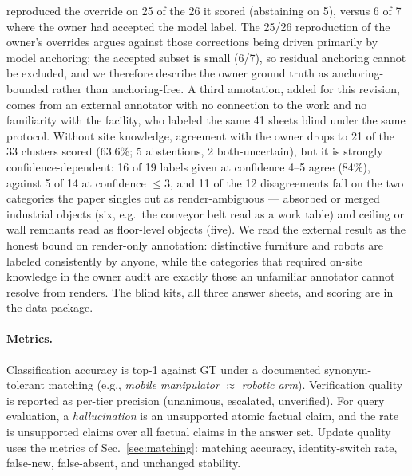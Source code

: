 reproduced the override on 25 of the 26 it scored (abstaining on 5),
versus 6 of 7 where the owner had accepted the model label. The 25/26 reproduction of the owner's overrides argues against those
corrections being driven primarily by model anchoring; the accepted
subset is small (6/7), so residual anchoring cannot be excluded, and we
therefore describe the owner ground truth as anchoring-bounded rather
than anchoring-free. A third annotation, added for this revision, comes
from an external annotator with no connection to the work and no
familiarity with the facility, who labeled the same 41 sheets blind
under the same protocol. Without site knowledge, agreement with the
owner drops to 21 of the 33 clusters scored (63.6\%; 5 abstentions, 2
both-uncertain), but it is strongly confidence-dependent: 16 of 19
labels given at confidence 4--5 agree (84\%), against 5 of 14 at
confidence $\leq$3, and 11 of the 12 disagreements fall on the two
categories the paper singles out as render-ambiguous --- absorbed or
merged industrial objects (six, e.g.\ the conveyor belt read as a work
table) and ceiling or wall remnants read as floor-level objects (five).
We read the external
result as the honest bound on render-only annotation: distinctive
furniture and robots are labeled consistently by anyone, while the
categories that required on-site knowledge in the owner audit are
exactly those an unfamiliar annotator cannot resolve from renders. The
blind kits, all three answer sheets,
and scoring are in the data package.

\paragraph{Metrics.}
Classification accuracy is top-1 against GT under a documented
synonym-tolerant matching (e.g., \emph{mobile manipulator} $\approx$
\emph{robotic arm}). Verification quality is reported as per-tier precision
(unanimous, escalated, unverified). For query evaluation, a
\emph{hallucination} is an unsupported atomic factual claim, and the rate is
unsupported claims over all factual claims in the answer set. Update quality
uses the metrics of Sec.~\ref{sec:matching}: matching accuracy,
identity-switch rate, false-new, false-absent, and unchanged stability.

